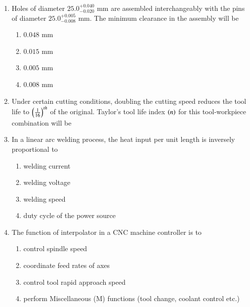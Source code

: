 \documentclass[journal,9pt,onecolumn]{IEEEtran}
\begin{document}
\begin{enumerate}
\item Holes of diameter $25.0^{+0.040}_{-0.020}$ mm are assembled interchangeably with the pins of diameter $25.0^{+0.005}_{-0.008}$ mm. The minimum clearance in the assembly will be

\begin{multicols}{4}
\begin{enumerate}
    \item $0.048$ mm
    \item $0.015$ mm
    \item $0.005$ mm
    \item $0.008$ mm
\end{enumerate}
\end{multicols}
    
\item Under certain cutting conditions, doubling the cutting speed reduces the tool life to $\left(\frac{1}{16}\right)^{th}$ of the original. Taylor's tool life index $\left(n\right)$ for this tool-workpiece combination will be 



    
\item In a linear arc welding process, the heat input per unit length is inversely proportional to

\begin{multicols}{2}
\begin{enumerate}
    \item welding current
    \item welding voltage
    \item welding speed
    \item duty cycle of the power source
\end{enumerate}
\end{multicols}



\item The function of interpolator in a CNC machine controller is to

\begin{enumerate}
    \item control spindle speed
    \item coordinate feed rates of axes
    \item control tool rapid approach speed
    \item perform Miscellaneous (M) functions (tool change, coolant control etc.)
\end{enumerate}


\end{enumerate}
\end{document}
